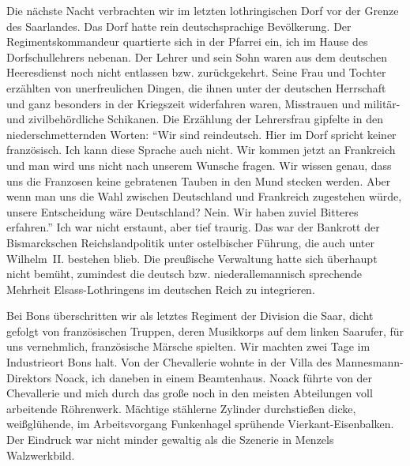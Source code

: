 \documentclass[a5paper,pagesize,10pt,twoside=true]{scrbook}
\begin{document}
Die nächste Nacht verbrachten wir im letzten lothringischen Dorf vor der Grenze des Saarlandes. Das Dorf hatte rein deutschsprachige Bevölkerung. Der Regimentskommandeur quartierte sich in der Pfarrei ein, ich im Hause des Dorfschullehrers nebenan. Der Lehrer und sein Sohn waren aus dem deutschen Heeresdienst noch nicht entlassen bzw. zurückgekehrt. Seine Frau und Tochter erzählten von unerfreulichen Dingen, die ihnen unter der deutschen Herrschaft und ganz besonders in der Kriegszeit widerfahren waren, Misstrauen und militär- und zivilbehördliche Schikanen. Die Erzählung der Lehrersfrau gipfelte in den niederschmetternden Worten: \enquote{Wir sind rein\linebreak deutsch. Hier im Dorf spricht keiner französisch. Ich kann diese Sprache auch nicht. Wir kommen jetzt an Frankreich und man wird uns nicht nach unserem Wunsche fragen. Wir wissen genau, dass uns die Franzosen keine gebratenen Tauben in den Mund stecken werden. Aber wenn man uns die Wahl zwischen Deutschland und Frankreich zugestehen würde, unsere Entscheidung wäre Deutschland? Nein. Wir haben zuviel Bitteres erfahren.} Ich war nicht erstaunt, aber tief traurig. Das war der Bankrott der Bismarckschen Reichslandpolitik unter ostelbischer Führung, die auch unter Wilhelm~II. bestehen blieb. Die preußische Verwaltung hatte sich überhaupt nicht bemüht, zumindest die deutsch bzw. niederallemannisch sprechende Mehrheit Elsass-Lothringens im deutschen Reich zu integrieren.

Bei Bons überschritten wir als letztes Regiment der Division die Saar, dicht gefolgt von französischen Truppen, deren Musikkorps auf dem linken Saar\-ufer, für uns vernehmlich, französische Märsche spielten. Wir machten zwei Tage im Industrieort Bons halt. Von der Chevallerie wohnte in der Villa des Mannesmann-Direktors Noack, ich daneben in einem Beamtenhaus. Noack führte von der Chevallerie und mich durch das große noch in den meisten Abteilungen voll arbeitende Röhrenwerk. Mächtige stählerne Zylinder durchstießen dicke, weißglühende, im Arbeitsvorgang Funkenhagel sprühende Vierkant-Eisenbalken. Der Eindruck war nicht minder gewaltig als die Szenerie in Menzels Walzwerkbild.
\end{document}

